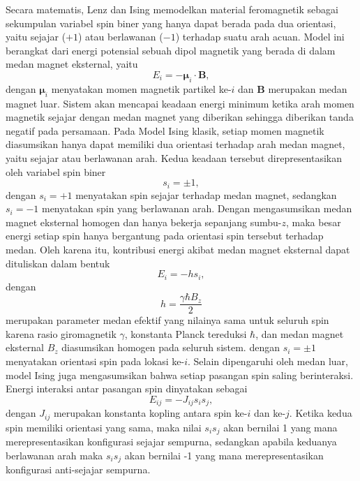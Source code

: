 Secara matematis, Lenz dan Ising memodelkan material feromagnetik sebagai sekumpulan variabel spin biner yang hanya dapat berada pada dua orientasi, yaitu sejajar ($+1$) atau berlawanan ($-1$) terhadap suatu arah acuan. Model ini berangkat dari energi potensial sebuah dipol magnetik yang berada di dalam medan magnet eksternal, yaitu
\begin{equation}
E_i=-\boldsymbol{\mu}_i\cdot\mathbf{B},
\label{eq:magnetic_dipole_energy}
\end{equation}
dengan $\boldsymbol{\mu}_i$ menyatakan momen magnetik partikel ke-$i$ dan $\mathbf{B}$ merupakan medan magnet luar. Sistem akan mencapai keadaan energi minimum ketika arah momen magnetik sejajar dengan medan magnet yang diberikan sehingga diberikan tanda negatif pada persamaan. Pada Model Ising klasik, setiap momen magnetik diasumsikan hanya dapat memiliki dua orientasi terhadap arah medan magnet, yaitu sejajar atau berlawanan arah. Kedua keadaan tersebut direpresentasikan oleh variabel spin biner
\begin{equation}
s_i=\pm1,
\end{equation}
dengan $s_i=+1$ menyatakan spin sejajar terhadap medan magnet, sedangkan $s_i=-1$ menyatakan spin yang berlawanan arah. Dengan mengasumsikan medan magnet eksternal homogen dan hanya bekerja sepanjang sumbu-$z$, maka besar energi setiap spin hanya bergantung pada orientasi spin tersebut terhadap medan. Oleh karena itu, kontribusi energi akibat medan magnet eksternal dapat dituliskan dalam bentuk
\begin{equation}
E_i=-hs_i,
\label{eq:energy_field_spin}
\end{equation}
dengan
\begin{equation}
h=\frac{\gamma\hbar B_z}{2}
\end{equation}
merupakan parameter medan efektif yang nilainya sama untuk seluruh spin karena rasio giromagnetik $\gamma$, konstanta Planck tereduksi $\hbar$, dan medan magnet eksternal $B_z$ diasumsikan homogen pada seluruh sistem.
dengan $s_i=\pm1$ menyatakan orientasi spin pada lokasi ke-$i$. Selain dipengaruhi oleh medan luar, model Ising juga mengasumsikan bahwa setiap pasangan spin saling berinteraksi. Energi interaksi antar pasangan spin dinyatakan sebagai
\begin{equation}
    \label{eq:energy_interaction}
E_{ij}=-J_{ij}s_is_j,
\end{equation}
dengan $J_{ij}$ merupakan konstanta kopling antara spin ke-$i$ dan ke-$j$. Ketika kedua spin memiliki orientasi yang sama, maka nilai $s_is_j$ akan bernilai 1 yang mana merepresentasikan konfigurasi sejajar sempurna, sedangkan apabila keduanya berlawanan arah maka $s_is_j$ akan bernilai -1 yang mana merepresentasikan konfigurasi anti-sejajar sempurna. 

